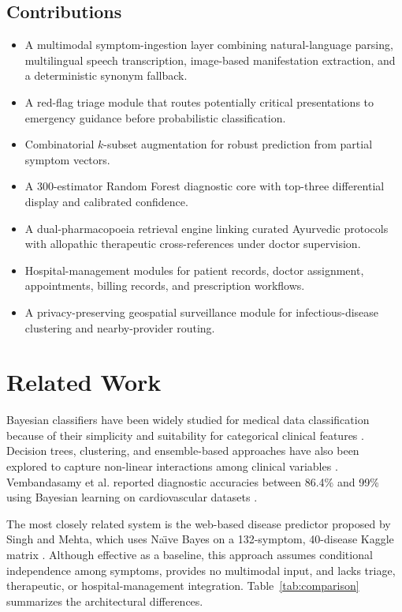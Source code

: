 \documentclass[conference]{IEEEtran}
\begin{document}
\subsection{Contributions}
\begin{itemize}
    \item A multimodal symptom-ingestion layer combining natural-language parsing, multilingual speech transcription, image-based manifestation extraction, and a deterministic synonym fallback.
    \item A red-flag triage module that routes potentially critical presentations to emergency guidance before probabilistic classification.
    \item Combinatorial $k$-subset augmentation for robust prediction from partial symptom vectors.
    \item A 300-estimator Random Forest diagnostic core with top-three differential display and calibrated confidence.
    \item A dual-pharmacopoeia retrieval engine linking curated Ayurvedic protocols with allopathic therapeutic cross-references under doctor supervision.
    \item Hospital-management modules for patient records, doctor assignment, appointments, billing records, and prescription workflows.
    \item A privacy-preserving geospatial surveillance module for infectious-disease clustering and nearby-provider routing.
\end{itemize}

\section{Related Work}
Bayesian classifiers have been widely studied for medical data classification because of their simplicity and suitability for categorical clinical features \cite{al2012medical, asuncion2007uci, soni2011predictive, pattekari2012prediction}. Decision trees, clustering, and ensemble-based approaches have also been explored to capture non-linear interactions among clinical variables \cite{masethe2014prediction, shouman2011using, shouman2012integrating}. Vembandasamy et al. reported diagnostic accuracies between 86.4\% and 99\% using Bayesian learning on cardiovascular datasets \cite{vembandasamy2015heart}.

The most closely related system is the web-based disease predictor proposed by Singh and Mehta, which uses Na{\"\i}ve Bayes on a 132-symptom, 40-disease Kaggle matrix \cite{singh2023disease}. Although effective as a baseline, this approach assumes conditional independence among symptoms, provides no multimodal input, and lacks triage, therapeutic, or hospital-management integration. Table~\ref{tab:comparison} summarizes the architectural differences.
\end{document}
